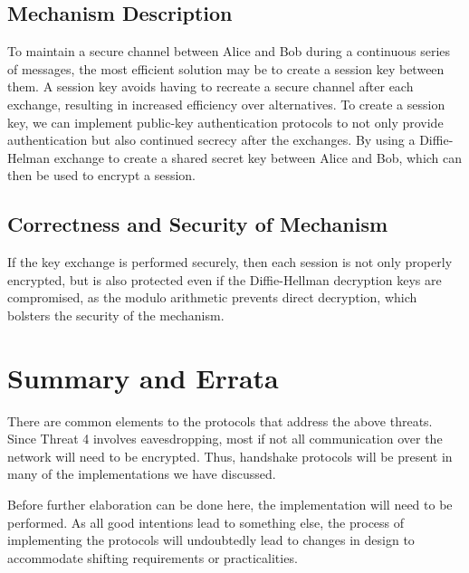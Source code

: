 \documentclass[11pt]{article}
\begin{document}
\subsection{Mechanism Description}
To maintain a secure channel between Alice and Bob during a continuous series of messages, the most efficient solution may be to create a session key between them. A session key avoids having to recreate a secure channel after each exchange, resulting in increased efficiency over alternatives. To create a session key, we can implement public-key authentication protocols to not only provide authentication but also continued secrecy after the exchanges. By using a Diffie-Helman exchange to create a shared secret key between Alice and Bob, which can then be used to encrypt a session.
\subsection{Correctness and Security of Mechanism}
If the key exchange is performed securely, then each session is not only properly encrypted, but is also protected even if the Diffie-Hellman decryption keys are compromised, as the modulo arithmetic prevents direct decryption, which bolsters the security of the mechanism.
\section{Summary and Errata}
There are common elements to the protocols that address the above threats. Since Threat 4 involves eavesdropping, most if not all communication over the network will need to be encrypted. Thus, handshake protocols will be present in many of the implementations we have discussed.

Before further elaboration can be done here, the implementation will need to be performed. As all good intentions lead to something else, the process of implementing the protocols will undoubtedly lead to changes in design to accommodate shifting requirements or practicalities.
\end{document}
